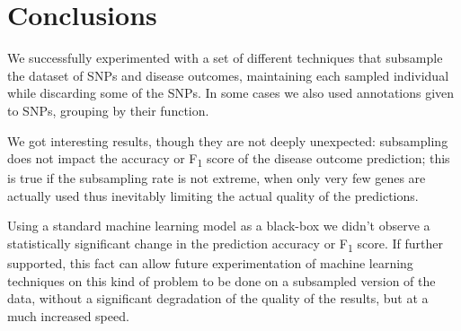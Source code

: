 \section{Conclusions}
\label{sec:conclusions}

We successfully experimented with a set of different techniques that subsample the dataset of SNPs and disease outcomes, maintaining each sampled individual while discarding some of the SNPs. In some cases we also used annotations given to SNPs, grouping by their function.

We got interesting results, though they are not deeply unexpected: subsampling does not impact the accuracy or F\textsubscript{1} score of the disease outcome prediction;
this is true if the subsampling rate is not extreme, when only very few genes are actually used thus inevitably limiting the actual quality of the predictions.

Using a standard machine learning model as a black-box we didn't observe a statistically significant change in the prediction accuracy or F\textsubscript{1} score.
If further supported, this fact can allow future experimentation of machine learning techniques on this kind of problem to be done on a subsampled version of the data, without a significant degradation of the quality of the results, but at a much increased speed.


